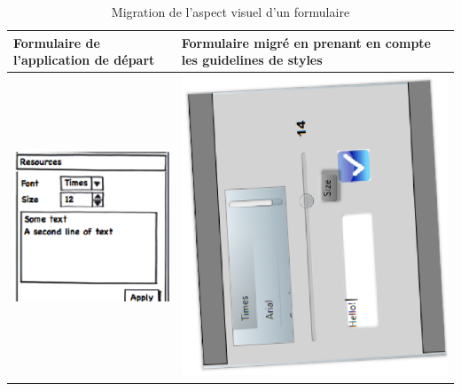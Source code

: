 \begin{table}[h]
\begin{center}
\vspace{3pt} \noindent
\begin{tabular}{|p{143pt}|p{271pt}|}
\hline
Formulaire de l'application de d\'{e}part& Formulaire migré en prenant en compte les guidelines de styles\\ 
\hline
\parbox{143pt}{ \includegraphics[scale=.8]{chap1/img-12}}& \parbox{271pt}{\includegraphics[angle=270, scale=.5]{chap1/img-13}}\\
\hline
\end{tabular}
\vspace{3pt}
\caption{Migration de l'aspect visuel d'un formulaire}
\label{tab:chap2:1}
\end{center}
\end{table}


